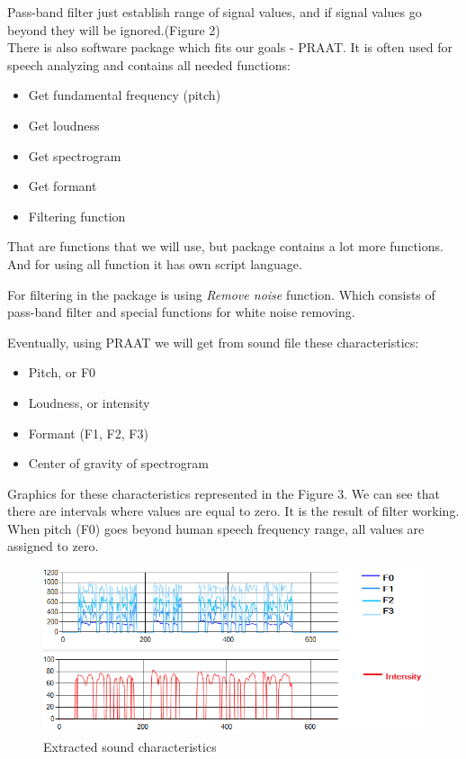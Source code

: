 \documentclass[12pt, letterpaper]{article}
\begin{document}
Pass-band filter just establish range of signal values, and if signal values go beyond they will be ignored.(Figure 2)
\\
There is also software package which fits our goals - PRAAT. It is often used for speech analyzing and contains all needed functions:
\begin{itemize}
	\item Get fundamental frequency (pitch)
	\item Get loudness
	\item Get spectrogram
	\item Get formant
	\item Filtering function
\end{itemize}

That are functions that we will use, but package contains a lot more functions. And for using all function it has own script language. 

For filtering in the package is using \textit{Remove noise} function. Which consists of pass-band filter and special functions for white noise removing.

Eventually, using PRAAT we will get from sound file these characteristics:
\begin{itemize}
	\item Pitch, or F0
	\item Loudness, or intensity
	\item Formant (F1, F2, F3)
	\item Center of gravity of spectrogram
\end{itemize}
Graphics for these characteristics represented in the Figure 3. We can see that there are intervals where values are equal to zero. It is the result of filter working. When pitch (F0) goes beyond human speech frequency range, all values are assigned to zero.
\begin{figure}
	\centering
		\includegraphics[scale=0.8]{images/sound-characteristics.png}
	\caption{Extracted sound characteristics}
	\label{fig:sound-characteristics}
\end{figure}
\end{document}
